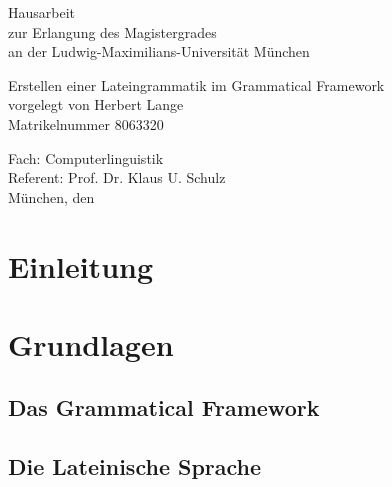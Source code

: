 \documentclass[fontsize=12pt,abstract=on,titlepage,bibliography=totoc,ngerman,listof=totoc]{scrreprt}
\begin{document}
\setcounter{tocdepth}{2}
\date{31.10.2013}
\makeatletter
\begin{titlepage}
{\sffamily
  \begin{center}
    \vspace{4cm}
    \begin{huge}
      Hausarbeit \\
      zur Erlangung des Magistergrades \\
      an der Ludwig-Maximilians-Universität München \\[3cm]
    \end{huge}
    {\Huge Erstellen einer Lateingrammatik im Grammatical Framework \\[4cm] }
    {\LARGE vorgelegt von Herbert Lange \\ Matrikelnummer 8063320 \\[3.5cm] }
  \end{center}
  \parindent0mm
  \begin{huge} 
    Fach: Computerlinguistik  \\[0.5cm]
    Referent: Prof. Dr. Klaus U. Schulz \\[0.5cm]
    München, den \@date 
  \end{huge}
}
\end{titlepage}

\makeatother
\tableofcontents
\clearpage
\setcounter{page}{1}
\chapter{Einleitung}
\label{chap:einleitung}

\pagebreak
\chapter{Grundlagen}
\label{chap:grundlagen}
\section{Das Grammatical Framework}
\label{sec:gf}

\pagebreak
\FloatBarrier
\section{Die Lateinische Sprache}
\label{sec:latein}

\pagebreak
\end{document}
